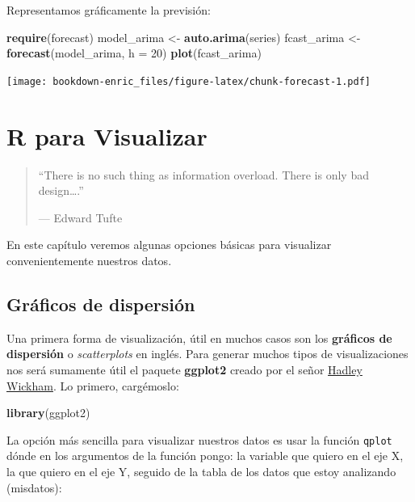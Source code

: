 \documentclass[]{book}
\newenvironment{Shaded}{\begin{snugshade}}{\end{snugshade}}
\newcommand{\KeywordTok}[1]{\textcolor[rgb]{0.13,0.29,0.53}{\textbf{{#1}}}}
\newcommand{\DataTypeTok}[1]{\textcolor[rgb]{0.13,0.29,0.53}{{#1}}}
\newcommand{\DecValTok}[1]{\textcolor[rgb]{0.00,0.00,0.81}{{#1}}}
\newcommand{\StringTok}[1]{\textcolor[rgb]{0.31,0.60,0.02}{{#1}}}
\newcommand{\NormalTok}[1]{{#1}}
\theoremstyle{definition}
\theoremstyle{definition}
\theoremstyle{remark}
\begin{document}
Representamos gráficamente la previsión:

\begin{Shaded}
\begin{Highlighting}[]
\KeywordTok{require}\NormalTok{(forecast)}
\NormalTok{model_arima <-}\StringTok{ }\KeywordTok{auto.arima}\NormalTok{(series)}
\NormalTok{fcast_arima <-}\StringTok{ }\KeywordTok{forecast}\NormalTok{(model_arima, }\DataTypeTok{h =} \DecValTok{20}\NormalTok{)}
\KeywordTok{plot}\NormalTok{(fcast_arima)}
\end{Highlighting}
\end{Shaded}

\texttt{[image: bookdown-enric\_files/figure-latex/chunk-forecast-1.pdf]}

\chapter{R para Visualizar}\label{r-para-visualizar}

\begin{quote}
``There is no such thing as information overload. There is only bad
design\ldots{}.''

--- Edward Tufte
\end{quote}

En este capítulo veremos algunas opciones básicas para visualizar
convenientemente nuestros datos.

\section{Gráficos de dispersión}\label{graficos-de-dispersion}

Una primera forma de visualización, útil en muchos casos son los
\textbf{gráficos de dispersión} o \emph{scatterplots} en inglés. Para
generar muchos tipos de visualizaciones nos será sumamente útil el
paquete \textbf{ggplot2} \citep{R-ggplot2} creado por el señor
\href{http://hadley.nz/}{Hadley Wickham}. Lo primero, cargémoslo:

\begin{Shaded}
\begin{Highlighting}[]
\KeywordTok{library}\NormalTok{(ggplot2) }
\end{Highlighting}
\end{Shaded}

La opción más sencilla para visualizar nuestros datos es usar la función
\texttt{qplot} dónde en los argumentos de la función pongo: la variable
que quiero en el eje X, la que quiero en el eje Y, seguido de la tabla
de los datos que estoy analizando (misdatos):
\end{document}
